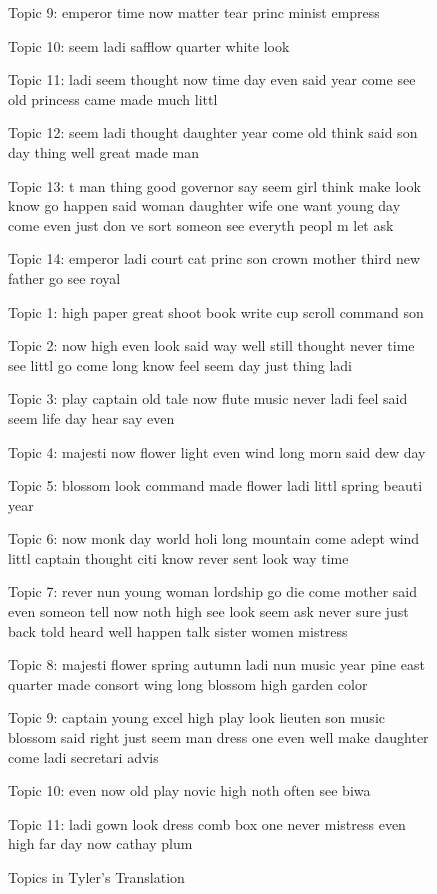 \documentclass[12pt]{article}
\begin{document}
\begin{flushleft}
\begin{spacing}{2.0}
\begin{figure}
Topic 9: emperor time now matter tear princ minist empress 

Topic 10: seem ladi safflow quarter white look 

Topic 11: ladi seem thought now time day even said year come see old princess came made much littl 

Topic 12: seem ladi thought daughter year come old think said son day thing well great made man 

Topic 13: t man thing good governor say seem girl think make look know go happen said woman daughter wife one want young day come even just don ve sort someon see everyth peopl m let ask 

Topic 14: emperor ladi court cat princ son crown mother third new father go see royal 
\end{figure}

\begin{figure}
\caption{Topics in Tyler's Translation}
\label{tyler-topics}
\singlespacing
\small
Topic 1: high paper great shoot book write cup scroll command son 

Topic 2: now high even look said way well still thought never time see littl go come long know feel seem day just thing ladi 

Topic 3: play captain old tale now flute music never ladi feel said seem life day hear say even 

Topic 4: majesti now flower light even wind long morn said dew day 

Topic 5: blossom look command made flower ladi littl spring beauti year 

Topic 6: now monk day world holi long mountain come adept wind littl captain thought citi know rever sent look way time 

Topic 7: rever nun young woman lordship go die come mother said even someon tell now noth high see look seem ask never sure just back told heard well happen talk sister women mistress 

Topic 8: majesti flower spring autumn ladi nun music year pine east quarter made consort wing long blossom high garden color 

Topic 9: captain young excel high play look lieuten son music blossom said right just seem man dress one even well make daughter come ladi secretari advis 

Topic 10: even now old play novic high noth often see biwa 

Topic 11: ladi gown look dress comb box one never mistress even high far day now cathay plum 


\end{figure}
\end{spacing}
\end{flushleft}
\end{document}
